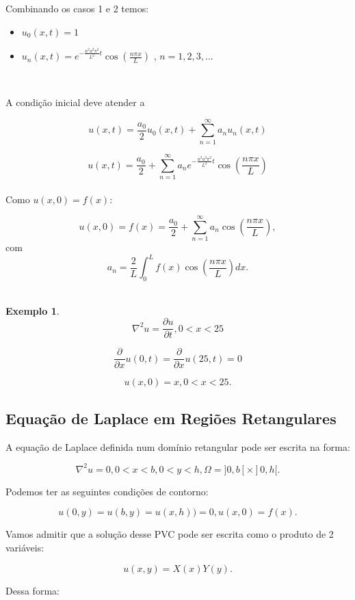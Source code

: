 \documentclass[a4paper,portuguese,9pt,final]{extarticle}
\newtheorem{example}{Exemplo}[section]
\begin{document}
\begin{multicols*}{2}
        Combinando os casos 1 e 2 temos:
        \begin{itemize}
            \item[] $ u_{0}(x,t)= 1$
            \item[] $ u_{n}(x,t)= e^{-\frac{n^{2}a^{2}\pi^{2}}{L^{2}}t} \cos \left(\frac{n\pi x}{L}\right)  $ , $n=1,2,3,...$
        \end{itemize}
        \

        A condição inicial deve atender a

        $$  u(x,t) = \frac{a_{0}}{2} u_{0}(x,t) + \sum_{n=1}^{\infty} a_{n}u_{n}(x,t)  $$

        $$ u(x,t) = \frac{a_{0}}{2} + \sum_{n=1}^{\infty} a_{n} e^{-\frac{n^{2}a^{2}\pi^{2}}{L^{2}}t} \cos \left(\frac{n\pi x}{L}\right)  $$ \\


        Como $ u(x,0)=f(x) $:

        $$  u(x,0)=f(x)= \frac{a_{0}}{2} + \sum_{n=1}^{\infty} a_{n} \cos \left(\frac{n\pi x}{L}\right),$$ com
        $$ a_{n}=\frac{2}{L} \int_{0}^{L}f(x)\cos \left(\frac{n\pi x}{L}\right) dx.$$ \\

        \begin{example}	
            $$\nabla^2 u = \frac{\partial u}{\partial t}, 0<x<25$$

            $$\frac{\partial}{\partial x}u(0,t) = \frac{\partial}{\partial x}u(25,t) = 0$$

            $$u(x,0) = x, 0<x<25.$$
        \end{example}

    \subsection{Equação de Laplace em Regiões Retangulares}

    A equação de Laplace definida num domínio retangular pode ser escrita na forma:

    $$ \nabla^{2}u =0, 0< x < b, 0 < y < h, \Omega = ]0,b[ \times ]0,h[.$$

    Podemos ter as seguintes condições de contorno:

    $$u(0,y) = u(b,y) = u(x,h)) = 0, u(x,0)=f(x).$$

    Vamos admitir que a solução desse PVC pode ser escrita como o produto de 2 variáveis:

    $$u(x,y) = X(x)Y(y).$$

    Dessa forma:


\end{multicols*}
\end{document}
